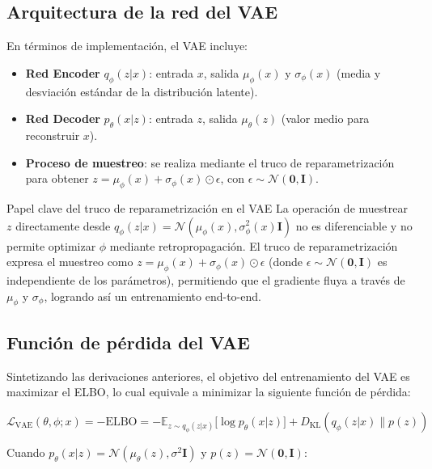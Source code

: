 \documentclass[a4paper]{article}
\begin{document}
\subsection{Arquitectura de la red del VAE}

En términos de implementación, el VAE incluye:

\begin{itemize}
    \item \textbf{Red Encoder} $q_\phi(z|x)$: entrada $x$, salida $\mu_\phi(x)$ y $\sigma_\phi(x)$ (media y desviación estándar de la distribución latente).
    \item \textbf{Red Decoder} $p_\theta(x|z)$: entrada $z$, salida $\mu_\theta(z)$ (valor medio para reconstruir $x$).
    \item \textbf{Proceso de muestreo}: se realiza mediante el truco de reparametrización para obtener $z = \mu_\phi(x) + \sigma_\phi(x) \odot \epsilon$, con $\epsilon \sim \mathcal{N}(\mathbf{0}, \mathbf{I})$.
\end{itemize}

\begin{knowledgebox}{Papel clave del truco de reparametrización en el VAE}
La operación de muestrear $z$ directamente desde $q_\phi(z|x) = \mathcal{N}(\mu_\phi(x), \sigma^2_\phi(x) \mathbf{I})$ no es diferenciable y no permite optimizar $\phi$ mediante retropropagación. El truco de reparametrización expresa el muestreo como $z = \mu_\phi(x) + \sigma_\phi(x) \odot \epsilon$ (donde $\epsilon \sim \mathcal{N}(\mathbf{0}, \mathbf{I})$ es independiente de los parámetros), permitiendo que el gradiente fluya a través de $\mu_\phi$ y $\sigma_\phi$, logrando así un entrenamiento end-to-end.
\end{knowledgebox}

\subsection{Función de pérdida del VAE}

Sintetizando las derivaciones anteriores, el objetivo del entrenamiento del VAE es maximizar el ELBO, lo cual equivale a minimizar la siguiente función de pérdida:

$$\mathcal{L}_{\text{VAE}}(\theta, \phi; x) = -\text{ELBO} = -\mathbb{E}_{z \sim q_\phi(z|x)}{[}\log p_\theta(x|z){]} + D_{\mathrm{KL}}(q_\phi(z|x) \| p(z))$$

Cuando $p_\theta(x|z) = \mathcal{N}(\mu_\theta(z), \sigma^2 \mathbf{I})$ y $p(z) = \mathcal{N}(\mathbf{0}, \mathbf{I})$:
\end{document}
